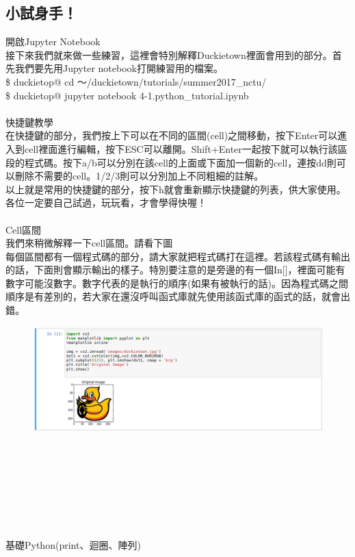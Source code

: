 \documentclass{article}
\begin{document}
\subsection{小試身手！}
開啟Jupyter Notebook
\\接下來我們就來做一些練習，這裡會特別解釋Duckietown裡面會用到的部分。首先我們要先用Jupyter notebook打開練習用的檔案。
\\\$ duckietop@ cd ～/duckietown/tutorials/summer2017\_nctu/
\\\$ duckietop@ jupyter notebook 4-1.python\_tutorial.ipynb
\\\\快捷鍵教學
\\在快捷鍵的部分，我們按上下可以在不同的區間(cell)之間移動，按下Enter可以進入到cell裡面進行編輯，按下ESC可以離開。Shift+Enter一起按下就可以執行該區段的程式碼。按下a/b可以分別在該cell的上面或下面加一個新的cell，連按dd則可以刪除不需要的cell。1/2/3則可以分別加上不同粗細的註解。
\\以上就是常用的快捷鍵的部分，按下h就會重新顯示快捷鍵的列表，供大家使用。各位一定要自己試過，玩玩看，才會學得快喔！
\\\\Cell區間
\\我們來稍微解釋一下cell區間。請看下圖
\\每個區間都有一個程式碼的部分，請大家就把程式碼打在這裡。若該程式碼有輸出的話，下面則會顯示輸出的樣子。特別要注意的是旁邊的有一個In[]，裡面可能有數字可能沒數字。數字代表的是執行的順序(如果有被執行的話)。因為程式碼之間順序是有差別的，若大家在還沒呼叫函式庫就先使用該函式庫的函式的話，就會出錯。
\\
\begin{figure}[htp]
    \begin{center}
        \includegraphics[width=450pt]{pic/3_1_1.png}
    \end{center}
\end{figure}
\\
\\\\\\\\\\\\基礎Python(print、迴圈、陣列)
\end{document}
